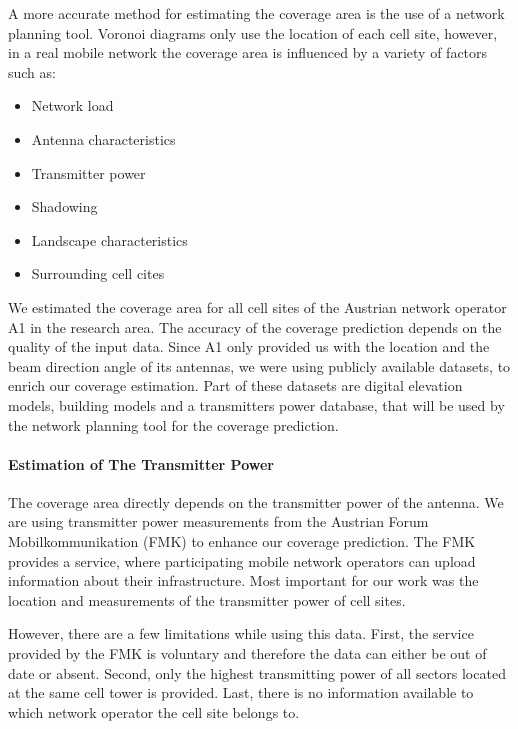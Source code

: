 \documentclass[twocolumn]{bmcart}%
\begin{document}
A more accurate method for estimating the coverage area is the use of a network planning tool. Voronoi diagrams only use the location of each cell site, however, in a real mobile network the coverage area is influenced by a variety of factors such as:
\begin{itemize}
	\item Network load
	\item Antenna characteristics
	\item Transmitter power
	\item Shadowing
	\item Landscape characteristics
	\item Surrounding cell cites
\end{itemize}

We estimated the coverage area for all cell sites of the Austrian network operator A1 in the research area. The accuracy of the coverage prediction depends on the quality of the input data. Since A1 only provided us with the location and the beam direction angle of its antennas, we were using publicly available datasets, to enrich our coverage estimation. Part of these datasets are digital elevation models, building models and a transmitters power database, that will be used by the network planning tool for the coverage prediction.

\paragraph{Estimation of The Transmitter Power}
The coverage area directly depends on the transmitter power of the antenna. We are using transmitter power measurements from the Austrian Forum Mobilkommunikation (FMK) to enhance our coverage prediction. The FMK provides a service, where participating mobile network operators can upload information about their infrastructure. Most important for our work was the location and measurements of the transmitter power of cell sites.

However, there are a few limitations while using this data. First, the service provided by the FMK is voluntary and therefore the data can either be out of date or absent. Second, only the highest transmitting power of all sectors located at the same cell tower is provided. Last, there is no information available to which network operator the cell site belongs to.
\end{document}
